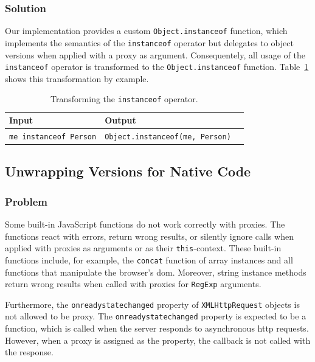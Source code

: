 \subsubsection{Solution}

Our implementation provides a custom \lstinline{Object.instanceof} function, which implements the semantics of the \lstinline{instanceof} operator but delegates to object versions when applied with a proxy as argument.
Consequentely, all usage of the \lstinline{instanceof} operator is transformed to the \lstinline{Object.instanceof} function.
Table~\ref{table:transformingInstanceof} shows this transformation by example.

\begin{table}[h]
\begin{center}
\begin{tabular}{| l | l | l |}
\hline
Input & Output \\ \hline
\lstinline|me instanceof Person| & \lstinline|Object.instanceof(me, Person)| \\ \hline
\end{tabular}
\end{center}
\caption[Table caption text]{Transforming the \lstinline{instanceof} operator.}
\label{table:transformingInstanceof}
\end{table}



\subsection{Unwrapping Versions for Native Code} \label{subsec:IMPLEMENTATION:4.3}


\subsubsection{Problem}

Some built-in JavaScript functions do not work correctly with proxies.
The functions react with errors, return wrong results, or silently ignore calls when applied with proxies as arguments or as their \lstinline{this}-context.
These built-in functions include, for example, the \lstinline{concat} function of array instances and all functions that manipulate the browser's \ac{dom}.
Moreover, string instance methods return wrong results when called with proxies for \lstinline{RegExp} arguments.

Furthermore, the \lstinline{onreadystatechanged} property of \lstinline{XMLHttpRequest} objects is not allowed to be proxy.
The \lstinline{onreadystatechanged} property is expected to be a function, which is called when the server responds to asynchronous \ac{http} requests. 
However, when a proxy is assigned as the property, the callback is not called with the response.


